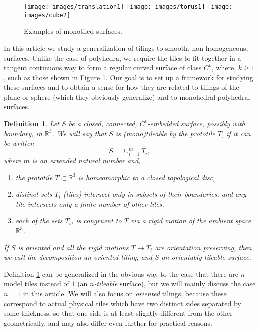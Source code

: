 \documentclass[11pt]{amsart}
\newcommand{\real}{\mathbb{R}}
\newcommand{\beq}{\begin{equation}}
\newcommand{\eeq}{\end{equation}}
\newtheorem{definition}[theorem]{Definition}
\theoremstyle{remark}
\newcounter{case}
\begin{document}
\begin{figure}[h!tbp]
	\begin{center}
				\texttt{[image: images/translation1]}  	 \quad    \quad
  \texttt{[image: images/torus1]}  				
   \quad   \quad
  \texttt{[image: images/cube2]}  														
		\end{center}
	\caption{Examples of monotiled surfaces.}
	\label{fig1}
\end{figure}

In this article we study a generalization of tilings to smooth, non-homogeneous, surfaces.
Unlike the case of polyhedra, we require the tiles to fit together in a tangent
continuous way to  form a regular curved surface of class $C^k$, where, $k \geq 1$, such as those shown in Figure \ref{fig1}.
Our goal is to set up a framework for studying these surfaces and to obtain a sense for how they are related to
tilings of the plane or sphere (which they obviously generalize) and to monohedral polyhedral surfaces.



\pagebreak
\begin{definition} \label{tilingdef}
Let $S$ be a closed, connected,  $C^k$-embedded surface, possibly with boundary, in $\real^3$.
We will say that $S$ is \emph{(mono)tileable} by the \emph{prototile} $T$, if it can be written
\beq \label{decomp1}
S=\cup_{i=1}^{m} T_{i},
\eeq
where $m$ is an extended natural number and,  
\begin{enumerate}
\item \label{cond1} the prototile $T \subset \real^3$ is homeomorphic to a closed topological disc,
\item \label{cond2} distinct sets $T_{i}$ (tiles) intersect only in subsets of their boundaries,
and any tile intersects only a finite number of other tiles,
\item \label{cond3} each of the sets $T_{i}$, is congruent to $T$ via a rigid motion of the ambient space $\real^3$.
\end{enumerate}
If $S$ is oriented and all the rigid motions $T \to T_i$ are orientation preserving, then we call the decomposition an \emph{oriented tiling}, and $S$ an \emph{orientably tileable} surface.
\end{definition}
Definition \ref{tilingdef} can be generalized in the obvious way to the case that there are $n$ model 
tiles instead of $1$ (an \emph{$n$-tileable} surface), but we will mainly discuss the case $n=1$ in this article.
We will also focus on \emph{oriented} tilings, because these correspond to actual physical tiles which have two distinct sides separated by some thickness, so that one side is at least slightly different from the other geometrically, and may also differ even further for practical reasons.   
\end{document}
